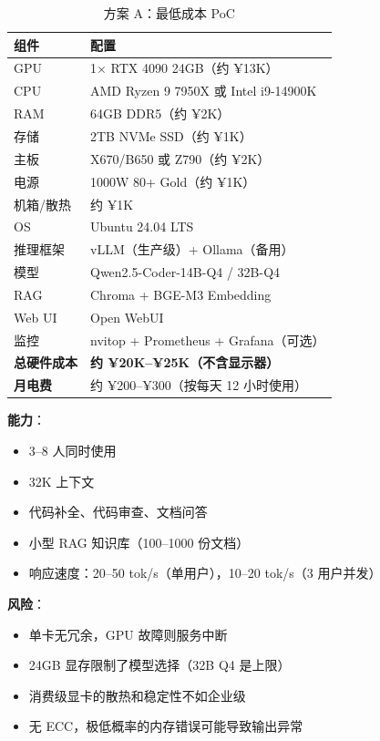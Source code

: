 \documentclass[UTF8,a4paper,10pt,oneside]{ctexart}
\begin{document}
\begin{table}[htbp]
\centering
\caption{方案 A：最低成本 PoC}
\begin{tabular}{p{2cm}p{7cm}}
\hline
\textbf{组件} & \textbf{配置} \\
\hline
GPU & 1$\times$ RTX 4090 24GB（约 ¥13K）\\
CPU & AMD Ryzen 9 7950X 或 Intel i9-14900K \\
RAM & 64GB DDR5（约 ¥2K）\\
存储 & 2TB NVMe SSD（约 ¥1K）\\
主板 & X670/B650 或 Z790（约 ¥2K）\\
电源 & 1000W 80+ Gold（约 ¥1K）\\
机箱/散热 & 约 ¥1K \\
OS & Ubuntu 24.04 LTS \\
推理框架 & vLLM（生产级）+ Ollama（备用）\\
模型 & Qwen2.5-Coder-14B-Q4 / 32B-Q4 \\
RAG & Chroma + BGE-M3 Embedding \\
Web UI & Open WebUI \\
监控 & nvitop + Prometheus + Grafana（可选）\\
\hline
\textbf{总硬件成本} & \textbf{约 ¥20K--¥25K（不含显示器）} \\
\textbf{月电费} & 约 ¥200--¥300（按每天 12 小时使用）\\
\hline
\end{tabular}
\end{table}

\textbf{能力}：
\begin{itemize}
    \item 3--8 人同时使用
    \item 32K 上下文
    \item 代码补全、代码审查、文档问答
    \item 小型 RAG 知识库（100--1000 份文档）
    \item 响应速度：20--50 tok/s（单用户），10--20 tok/s（3 用户并发）
\end{itemize}

\textbf{风险}：
\begin{itemize}
    \item 单卡无冗余，GPU 故障则服务中断
    \item 24GB 显存限制了模型选择（32B Q4 是上限）
    \item 消费级显卡的散热和稳定性不如企业级
    \item 无 ECC，极低概率的内存错误可能导致输出异常
\end{itemize}
\end{document}
